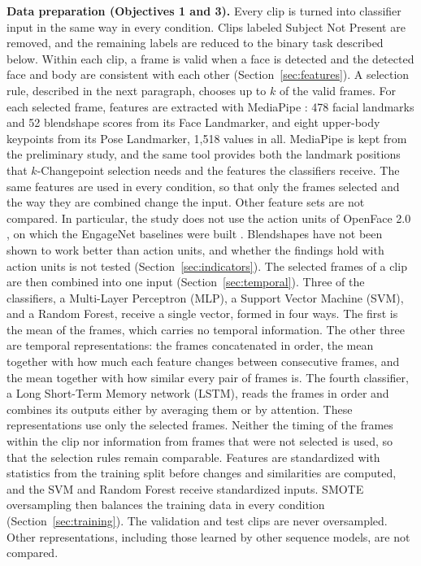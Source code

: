 \textbf{Data preparation (Objectives 1 and 3).} Every clip is turned into classifier input in the same way in every condition. Clips labeled Subject Not Present are removed, and the remaining labels are reduced to the binary task described below. Within each clip, a frame is valid when a face is detected and the detected face and body are consistent with each other (Section~\ref{sec:features}). A selection rule, described in the next paragraph, chooses up to $k$ of the valid frames. For each selected frame, features are extracted with MediaPipe \cite{lugaresi2019}: 478 facial landmarks and 52 blendshape scores from its Face Landmarker, and eight upper-body keypoints from its Pose Landmarker, 1,518 values in all. MediaPipe is kept from the preliminary study, and the same tool provides both the landmark positions that $k$-Changepoint selection needs and the features the classifiers receive. The same features are used in every condition, so that only the frames selected and the way they are combined change the input. Other feature sets are not compared. In particular, the study does not use the action units of OpenFace 2.0 \cite{baltrusaitis2018}, on which the EngageNet baselines were built \cite{singh2023}. Blendshapes have not been shown to work better than action units, and whether the findings hold with action units is not tested (Section~\ref{sec:indicators}). The selected frames of a clip are then combined into one input (Section~\ref{sec:temporal}). Three of the classifiers, a Multi-Layer Perceptron (MLP), a Support Vector Machine (SVM), and a Random Forest, receive a single vector, formed in four ways. The first is the mean of the frames, which carries no temporal information. The other three are temporal representations: the frames concatenated in order, the mean together with how much each feature changes between consecutive frames, and the mean together with how similar every pair of frames is. The fourth classifier, a Long Short-Term Memory network (LSTM), reads the frames in order and combines its outputs either by averaging them or by attention. These representations use only the selected frames. Neither the timing of the frames within the clip nor information from frames that were not selected is used, so that the selection rules remain comparable. Features are standardized with statistics from the training split before changes and similarities are computed, and the SVM and Random Forest receive standardized inputs. SMOTE oversampling \cite{chawla2002} then balances the training data in every condition (Section~\ref{sec:training}). The validation and test clips are never oversampled. Other representations, including those learned by other sequence models, are not compared.

